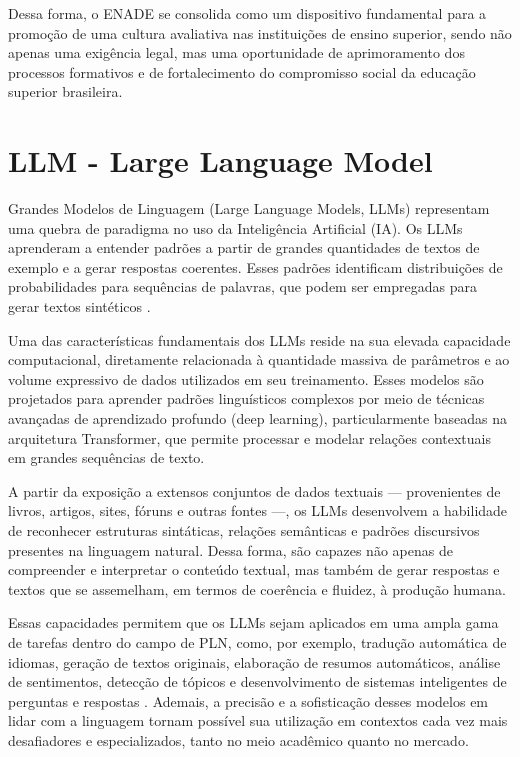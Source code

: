 Dessa forma, o ENADE se consolida como um dispositivo fundamental para a promoção de uma cultura avaliativa nas instituições de ensino superior, sendo não apenas uma exigência legal, mas uma oportunidade de aprimoramento dos processos formativos e de fortalecimento do compromisso social da educação superior brasileira.

\section{LLM - Large Language Model}

Grandes Modelos de Linguagem (Large Language Models, LLMs) representam uma quebra de paradigma no uso da Inteligência Artificial (IA)\cite{raposo2024avaliaccao}. Os LLMs aprenderam a entender padrões a partir de grandes quantidades de textos de exemplo e a gerar respostas coerentes. Esses padrões identificam distribuições de probabilidades para sequências de palavras, que podem ser empregadas para gerar textos sintéticos \cite{peres2023grandes}.

Uma das características fundamentais dos LLMs reside na sua elevada capacidade computacional, diretamente relacionada à quantidade massiva de parâmetros e ao volume expressivo de dados utilizados em seu treinamento. Esses modelos são projetados para aprender padrões linguísticos complexos por meio de técnicas avançadas de aprendizado profundo (deep learning), particularmente baseadas na arquitetura Transformer, que permite processar e modelar relações contextuais em grandes sequências de texto.

 A partir da exposição a extensos conjuntos de dados textuais — provenientes de livros, artigos, sites, fóruns e outras fontes —, os LLMs desenvolvem a habilidade de reconhecer estruturas sintáticas, relações semânticas e padrões discursivos presentes na linguagem natural. Dessa forma, são capazes não apenas de compreender e interpretar o conteúdo textual, mas também de gerar respostas e textos que se assemelham, em termos de coerência e fluidez, à produção humana.

 Essas capacidades permitem que os LLMs sejam aplicados em uma ampla gama de tarefas dentro do campo de PLN, como, por exemplo, tradução automática de idiomas, geração de textos originais, elaboração de resumos automáticos, análise de sentimentos, detecção de tópicos e desenvolvimento de sistemas inteligentes de perguntas e respostas \cite{eze2025}. Ademais, a precisão e a sofisticação desses modelos em lidar com a linguagem tornam possível sua utilização em contextos cada vez mais desafiadores e especializados, tanto no meio acadêmico quanto no mercado.
 
